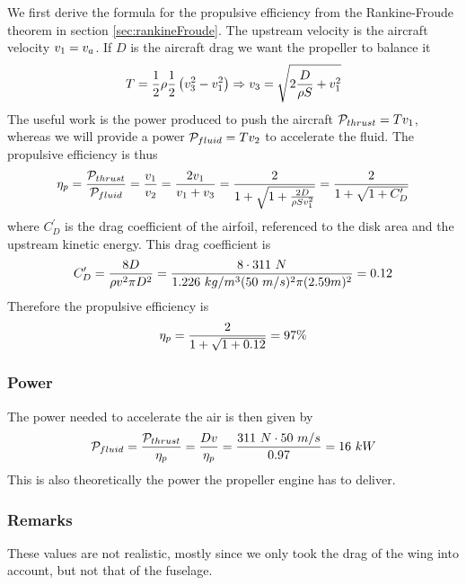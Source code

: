 We first derive the formula for the propulsive efficiency from the
Rankine-Froude theorem in section \ref{sec:rankineFroude}.  The
upstream velocity is the aircraft velocity $v_1 = v_a$. If $D$
is the aircraft drag we want the propeller to balance it
\begin{align*}
  T = \frac{1}{2} \rho \frac{1}{2} \left(v_3^2 -v_1^2\right) 
  \Rightarrow v_3 = \sqrt{2 \frac{D}{\rho S} + v_1^2}
\end{align*}
The useful work is the power produced to push the aircraft
$\mathcal P_{thrust} = T v_1$, whereas we will provide a power
$\mathcal P_{fluid} = T v_2$ to accelerate the fluid. The propulsive
efficiency is thus
\begin{align*}
  \eta_p 
  = \frac{\mathcal P_{thrust}}{\mathcal P_{fluid}} 
  = \frac{v_1}{v_2} 
  = \frac{2 v_1}{v_1 + v_3} 
  = \frac{2}{1 + \sqrt{1 + \frac{2D}{\rho S v_1^2}}} 
  = \frac{2}{1 + \sqrt{1 + C_D^\prime}}
\end{align*}
where $C_D^\prime$ is the drag coefficient of the airfoil, referenced
to the disk area and the upstream kinetic energy. This drag coefficient is
\begin{align*}
  C_D^\prime 
  = \frac{8D}{\rho v^2 \pi D^2} 
  = \frac{8 \cdot 311~N}{1.226~kg/m^3 (50~m/s)^2 \pi (2.59 m)^2} 
  = 0.12
\end{align*}
Therefore the propulsive efficiency is
\begin{align*}
  \eta_p = \frac{2}{1 + \sqrt{1 + 0.12}} = 97\%
\end{align*}

\subsubsection*{Power}

The power needed to accelerate the air is then given by
\begin{align*}
  \mathcal P_{fluid} 
  = \frac{\mathcal P_{thrust}}{\eta_p} 
  = \frac{D v}{\eta_p} 
  = \frac{311~N \cdot 50~m/s}{0.97} 
  = 16~kW
\end{align*}
This is also theoretically the power the propeller engine has to
deliver.

\subsubsection*{Remarks}

These values are not realistic, mostly since we only took the drag of
the wing into account, but not that of the fuselage. 

